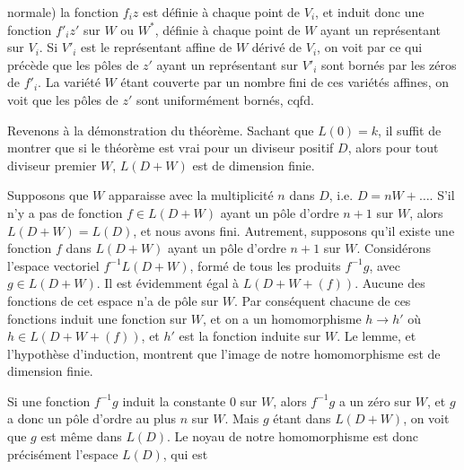 normale) la fonction $f_i z$ est définie à chaque point de $V_i$, et induit donc une fonction $f'_i z'$ sur $W$ ou $W^*$, définie à chaque point de $W$ ayant un représentant sur $V_i$. Si $V'_i$ est le représentant affine de $W$ dérivé de $V_i$, on voit par ce qui précède que les pôles de $z'$ ayant un représentant sur $V'_i$ sont bornés par les zéros de $f'_i$. La variété $W$ étant couverte par un nombre fini de ces variétés affines, on voit que les pôles de $z'$ sont uniformément bornés, cqfd.

Revenons à la démonstration du théorème. Sachant que $L(0)=k$, il suffit de montrer que si le théorème est vrai pour un diviseur positif $D$, alors pour tout diviseur premier $W$, $L(D+W)$ est de dimension finie.

Supposons que $W$ apparaisse avec la multiplicité $n$ dans $D$, i.e. $D=nW+\ldots$. S'il n'y a pas de fonction $f\in L(D+W)$ ayant un pôle d'ordre $n+1$ sur $W$, alors $L(D+W)=L(D)$, et nous avons fini. Autrement, supposons qu'il existe une fonction $f$ dans $L(D+W)$ ayant un pôle d'ordre $n+1$ sur $W$. Considérons l'espace vectoriel $f^{-1}L(D+W)$, formé de tous les produits $f^{-1}g$, avec $g\in L(D+W)$. Il est évidemment égal à $L(D+W+(f))$. Aucune des fonctions de cet espace n'a de pôle sur $W$. Par conséquent chacune de ces fonctions induit une fonction sur $W$, et on a un homomorphisme $h\longrightarrow h'$ où $h\in L(D+W+(f))$, et $h'$ est la fonction induite sur $W$. Le lemme, et l'hypothèse d'induction, montrent que l'image de notre homomorphisme est de dimension finie.

Si une fonction $f^{-1}g$ induit la constante $0$ sur $W$, alors $f^{-1}g$ a un zéro sur $W$, et $g$ a donc un pôle d'ordre au plus $n$ sur $W$. Mais $g$ étant dans $L(D+W)$, on voit que $g$ est même dans $L(D)$. Le noyau de notre homomorphisme est donc précisément l'espace $L(D)$, qui est

